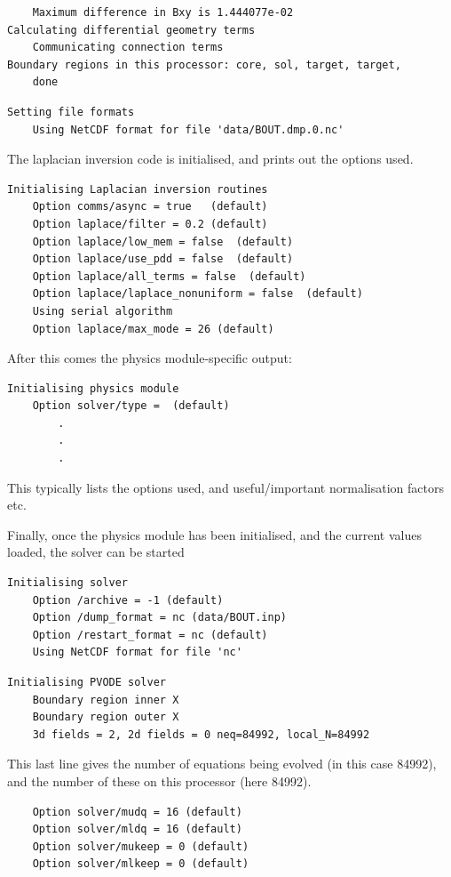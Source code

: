 \documentclass[12pt]{article}
\begin{document}
\begin{verbatim}
	Maximum difference in Bxy is 1.444077e-02
Calculating differential geometry terms
	Communicating connection terms
Boundary regions in this processor: core, sol, target, target,
	done
\end{verbatim}

\begin{verbatim}
Setting file formats
	Using NetCDF format for file 'data/BOUT.dmp.0.nc'
\end{verbatim}

The laplacian inversion code is initialised, and prints out the options used.
\begin{verbatim}
Initialising Laplacian inversion routines
	Option comms/async = true   (default)
	Option laplace/filter = 0.2 (default)
	Option laplace/low_mem = false  (default)
	Option laplace/use_pdd = false  (default)
	Option laplace/all_terms = false  (default)
	Option laplace/laplace_nonuniform = false  (default)
	Using serial algorithm
	Option laplace/max_mode = 26 (default)
\end{verbatim}

After this comes the physics module-specific output:
\begin{verbatim}
Initialising physics module
	Option solver/type =  (default)
        .
        .
        .
\end{verbatim}
This typically lists the options used, and useful/important normalisation factors etc.

Finally, once the physics module has been initialised,
and the current values loaded, the solver can be started
\begin{verbatim}
Initialising solver
	Option /archive = -1 (default)
	Option /dump_format = nc (data/BOUT.inp)
	Option /restart_format = nc (default)
	Using NetCDF format for file 'nc'
\end{verbatim}

\begin{verbatim}
Initialising PVODE solver
	Boundary region inner X
	Boundary region outer X
	3d fields = 2, 2d fields = 0 neq=84992, local_N=84992
\end{verbatim}
This last line gives the number of equations being evolved (in this case 84992),
and the number of these on this processor (here 84992).
\begin{verbatim}
	Option solver/mudq = 16 (default)
	Option solver/mldq = 16 (default)
	Option solver/mukeep = 0 (default)
	Option solver/mlkeep = 0 (default)
\end{verbatim}
\end{document}
